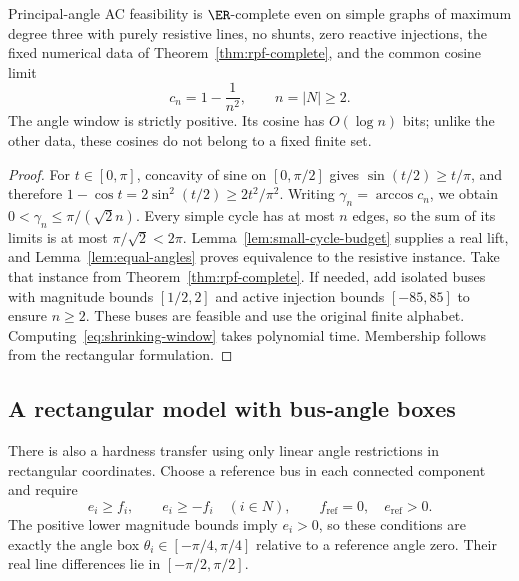 \begin{corollary}
\label{cor:principal-hardness}
Principal-angle AC feasibility is $\ER$-complete even on simple graphs of
maximum degree three with purely resistive lines, no shunts, zero reactive
injections, the fixed numerical data of Theorem~\ref{thm:rpf-complete}, and
the common cosine limit
\begin{equation}
 c_n=1-\frac{1}{n^2},\qquad n=|N|\ge2.
 \label{eq:shrinking-window}
\end{equation}
The angle window is strictly positive. Its cosine has $O(\log n)$ bits;
unlike the other data, these cosines do not belong to a fixed finite set.
\end{corollary}
\begin{proof}
For $t\in[0,\pi]$, concavity of sine on $[0,\pi/2]$ gives
$\sin(t/2)\ge t/\pi$, and therefore
$1-\cos t=2\sin^2(t/2)\ge2t^2/\pi^2$.
Writing $\gamma_n=\arccos c_n$, we obtain
$0<\gamma_n\le\pi/(\sqrt{2}n)$.
Every simple cycle has at most $n$ edges, so the sum of its limits is at
most $\pi/\sqrt{2}<2\pi$. Lemma~\ref{lem:small-cycle-budget} supplies a
real lift, and Lemma~\ref{lem:equal-angles} proves equivalence to the
resistive instance. Take that instance from Theorem~\ref{thm:rpf-complete}.
If needed, add isolated buses with magnitude bounds $[1/2,2]$ and active
injection bounds $[-85,85]$ to ensure $n\ge2$. These buses are feasible
and use the original finite alphabet. Computing~\eqref{eq:shrinking-window} takes
polynomial time. Membership follows from the rectangular formulation.
\end{proof}

\subsection{A rectangular model with bus-angle boxes}
\label{subsec:angle-box}

There is also a hardness transfer using only linear angle restrictions in
rectangular coordinates. Choose a reference bus in each connected component
and require
\begin{equation}
 e_i\ge f_i,\qquad e_i\ge-f_i\quad(i\in N),\qquad
 f_{\mathrm{ref}}=0,\quad e_{\mathrm{ref}}>0.
 \label{eq:angle-box}
\end{equation}
The positive lower magnitude bounds imply $e_i>0$, so these conditions are
exactly the angle box $\theta_i\in[-\pi/4,\pi/4]$ relative to a reference
angle zero. Their real line differences lie in $[-\pi/2,\pi/2]$.

